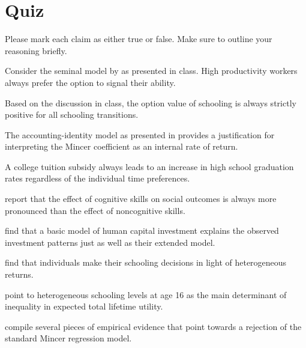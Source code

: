 \FloatBarrier\section{Quiz}
Please mark each claim as either true or false. Make sure to outline your reasoning briefly.

\begin{boenumerate}
\item Consider the seminal model by \cite{Spence.1973} as presented in class. High productivity workers always prefer the option to signal their ability.

\item Based on the discussion in class, the option value of schooling is always strictly positive for all schooling transitions.

\item The accounting-identity model as presented in \cite{Heckman.2006a} provides a justification for interpreting the Mincer coefficient as an internal rate of return.

\item A college tuition subsidy always leads to an increase in high school graduation rates regardless of the individual time preferences.

\item \cite{Heckman.2006b} report that the effect of cognitive skills on social outcomes is always more pronounced than the effect of noncognitive skills.

\item \cite{Keane.1997} find that a basic model of human capital investment explains the observed investment patterns just as well as their extended model.

\item \cite{Carneiro.2011} find that individuals make their schooling decisions in light of heterogeneous returns.

\item \cite{Keane.1997} point to heterogeneous schooling levels at age 16 as the main determinant of inequality in expected total lifetime utility.

\item \cite{Heckman.2006a} compile several pieces of empirical evidence that point towards a rejection of the standard Mincer regression model.


\end{boenumerate}
